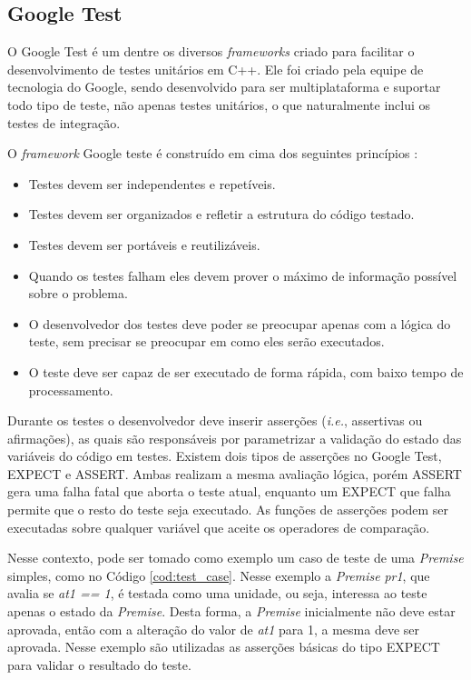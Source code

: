 \subsection{Google Test}

O Google Test é um dentre os diversos \textit{frameworks} criado para facilitar
o desenvolvimento de testes unitários em C++. Ele foi criado pela equipe de
tecnologia do Google, sendo desenvolvido para ser multiplataforma e suportar
todo tipo de teste, não apenas testes unitários, o que naturalmente inclui os
testes de integração.

O \textit{framework} Google teste é construído em cima dos seguintes princípios
\cite{google_test_primer}:

\begin{itemize}
  \item Testes devem ser independentes e repetíveis.
  \item Testes devem ser organizados e refletir a estrutura do código testado.
  \item Testes devem ser portáveis e reutilizáveis.
  \item Quando os testes falham eles devem prover o máximo de informação
        possível sobre o problema.
  \item O desenvolvedor dos testes deve poder se preocupar apenas com a lógica do
  teste, sem precisar se preocupar em como eles serão executados.
  \item O teste deve ser capaz de ser executado de forma rápida, com baixo tempo
  de processamento.
\end{itemize}

Durante os testes o desenvolvedor deve inserir asserções (\textit{i.e.},
assertivas ou afirmações), as quais são responsáveis por parametrizar a
validação do estado das variáveis do código em testes. Existem dois tipos de
asserções no Google Test, EXPECT e ASSERT. Ambas realizam a mesma avaliação
lógica, porém ASSERT gera uma falha fatal que aborta o teste atual, enquanto um
EXPECT que falha permite que o resto do teste seja executado.  As funções de
asserções podem ser executadas sobre qualquer variável que aceite os operadores
de comparação.

Nesse contexto, pode ser tomado como exemplo um caso de teste de uma
\textit{Premise} simples, como no Código \ref{cod:test_case}. Nesse exemplo a
\textit{Premise} \textit{pr1}, que avalia se \textit{at1 == 1}, é testada como
uma unidade, ou seja, interessa ao teste apenas o estado da \textit{Premise}.
Desta forma, a \textit{Premise} inicialmente não deve estar aprovada,
então com a alteração do valor de \textit{at1} para 1, a mesma deve ser
aprovada. Nesse exemplo são utilizadas as asserções básicas do tipo EXPECT para
validar o resultado do teste.

